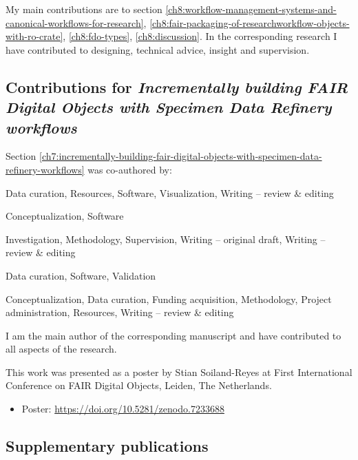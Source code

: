My main contributions are to section \ref{ch8:workflow-management-systems-and-canonical-workflows-for-research}, \ref{ch8:fair-packaging-of-researchworkflow-objects-with-ro-crate}, \ref{ch8:fdo-types},
\ref{ch8:discussion}. In the corresponding research I have contributed to designing, technical advice, insight and supervision.


\subsection{Contributions for \emph{Incrementally
building FAIR Digital Objects with Specimen Data Refinery workflows}}\label{ch10:incrementally-fdo}

Section \vref{ch7:incrementally-building-fair-digital-objects-with-specimen-data-refinery-workflows} was co-authored by:

\begin{description}
\tightlist
\item[Oliver Woolland]
Data curation, Resources, Software, Visualization, Writing -- review \&
editing
\item[Paul Brack]
Conceptualization, Software
\item[Stian Soiland-Reyes]
Investigation, Methodology, Supervision, Writing -- original draft,
Writing -- review \& editing
\item[Ben Scott]
Data curation, Software, Validation
\item[Laurence Livermore]
Conceptualization, Data curation, Funding acquisition, Methodology,
Project administration, Resources, Writing -- review \& editing
\end{description}

I am the main author of the corresponding manuscript and have contributed to all aspects of the research. 


This work was presented as a poster by Stian Soiland-Reyes at First International Conference on FAIR Digital Objects, Leiden, The Netherlands.

\begin{itemize}
\tightlist
\item
  Poster: \url{https://doi.org/10.5281/zenodo.7233688}
\end{itemize}


\subsection{Supplementary publications}\label{ch10:supplementary-publications}


